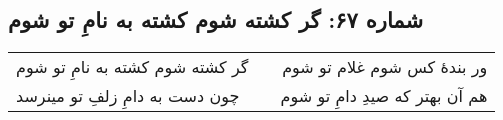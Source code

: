 \begin{center}
\section*{شماره ۶۷: گر کشته شوم کشته به نامِ تو شوم}
\label{sec:067}
\begin{longtable}{l p{0.5cm} r}
گر کشته شوم کشته به نامِ تو شوم
&&
ور بندهٔ کس شوم غلام تو شوم
\\
چون دست به دامِ زلفِ تو مینرسد
&&
هم آن بهتر که صیدِ دامِ تو شوم
\\
\end{longtable}
\end{center}
